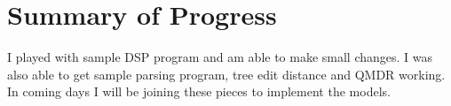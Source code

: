 \documentclass[11pt]{article}
\begin{document}
\section{Summary of Progress} 

I played with sample DSP program and am able to make small changes. I was also able to get sample parsing program, tree edit distance and QMDR working. In coming days I will be joining these pieces to implement the models. 



\appendix
\end{document}
